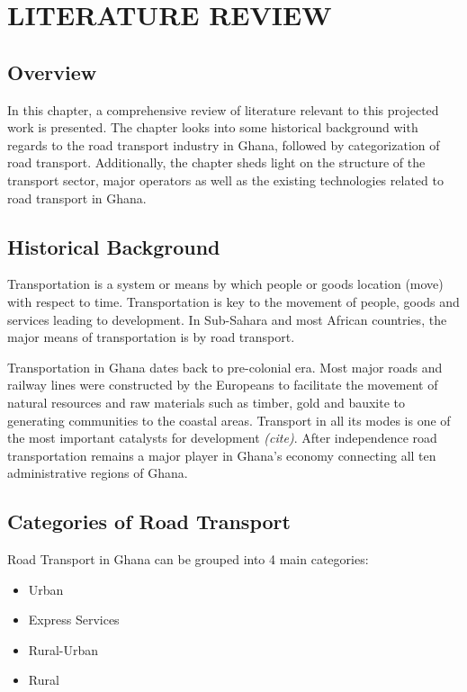 
\chapter{LITERATURE REVIEW} %
\section{Overview}
In this chapter, a comprehensive review of literature relevant to this projected work is presented. The chapter looks into some historical background with regards to the road transport industry in Ghana, followed by categorization of road transport. Additionally, the chapter sheds light on the structure of the transport sector, major operators as well as the existing technologies related to road transport in Ghana.



\section{Historical Background}
Transportation is a system or means by which people or goods location (move) with respect to time. Transportation is key to the movement of people, goods and services leading to development. In Sub-Sahara and most African countries, the major means of transportation is by road transport.

Transportation in Ghana dates back to pre-colonial era. Most major roads and railway lines were constructed by the Europeans to facilitate the movement of natural resources and raw materials such as timber, gold and bauxite to generating communities to the coastal areas. Transport in all its modes is one of the most important catalysts for development \textit{(cite)}. %
After independence road transportation remains a major player in Ghana's economy connecting all ten administrative regions of Ghana. 

\section{Categories of Road Transport}
Road Transport in Ghana can be grouped into 4 main categories:
\begin{itemize}
	\item Urban
	\item Express Services
	\item Rural-Urban
	\item Rural
\end{itemize}


